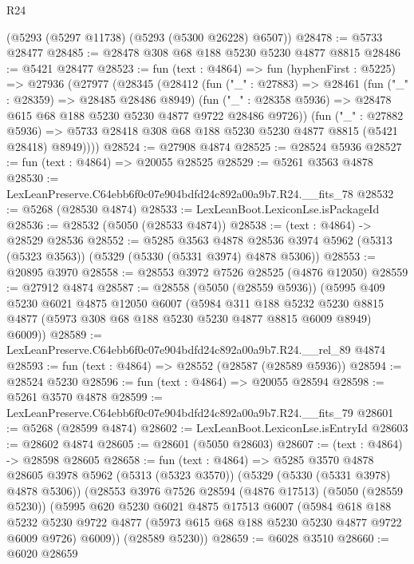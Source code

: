 \begin{lexlean}{R24}
\begin{coremodule}
    (@5293 (@5297 @11738) (@5293 (@5300 @26228) @6507))
@28478 := @5733 @28477
@28485 := @28478 @308 @68 @188 @5230 @5230 @4877 @8815
@28486 := @5421 @28477
@28523 := fun (text : @4864) =>
  fun (hyphenFirst : @5225) =>
  @27936
    (@27977
      (@28345
        (@28412
          (fun ("_" : @27883) =>
          @28461
            (fun ("_" : @28359) => @28485 @28486 @8949)
            (fun ("_" : @28358 @5936) => @28478 @615 @68 @188 @5230 @5230 @4877 @9722 @28486 @9726))
          (fun ("_" : @27882 @5936) =>
          @5733 @28418 @308 @68 @188 @5230 @5230 @4877 @8815 (@5421 @28418) @8949))))
@28524 := @27908 @4874
@28525 := @28524 @5936
@28527 := fun (text : @4864) => @20055 @28525
@28529 := @5261 @3563 @4878
@28530 := LexLeanPreserve.C64ebb6f0c07e904bdfd24c892a00a9b7.R24.__fits_78
@28532 := @5268 (@28530 @4874)
@28533 := LexLeanBoot.LexiconLse.isPackageId
@28536 := @28532 (@5050 (@28533 @4874))
@28538 := (text : @4864) -> @28529 @28536
@28552 := @5285
    @3563
    @4878
    @28536
    @3974
    @5962
    (@5313 (@5323 @3563))
    (@5329 (@5330 (@5331 @3974) @4878 @5306))
@28553 := @20895 @3970
@28558 := @28553 @3972 @7526 @28525 (@4876 @12050)
@28559 := @27912 @4874
@28587 := @28558
    (@5050 (@28559 @5936))
    (@5995
      @409
      @5230
      @6021
      @4875
      @12050
      @6007
      (@5984
        @311
        @188
        @5232
        @5230
        @8815
        @4877
        (@5973 @308 @68 @188 @5230 @5230 @4877 @8815 @6009 @8949)
        @6009))
@28589 := LexLeanPreserve.C64ebb6f0c07e904bdfd24c892a00a9b7.R24.__rel_89 @4874
@28593 := fun (text : @4864) => @28552 (@28587 (@28589 @5936))
@28594 := @28524 @5230
@28596 := fun (text : @4864) => @20055 @28594
@28598 := @5261 @3570 @4878
@28599 := LexLeanPreserve.C64ebb6f0c07e904bdfd24c892a00a9b7.R24.__fits_79
@28601 := @5268 (@28599 @4874)
@28602 := LexLeanBoot.LexiconLse.isEntryId
@28603 := @28602 @4874
@28605 := @28601 (@5050 @28603)
@28607 := (text : @4864) -> @28598 @28605
@28658 := fun (text : @4864) =>
  @5285
    @3570
    @4878
    @28605
    @3978
    @5962
    (@5313 (@5323 @3570))
    (@5329 (@5330 (@5331 @3978) @4878 @5306))
    (@28553
      @3976
      @7526
      @28594
      (@4876 @17513)
      (@5050 (@28559 @5230))
      (@5995
        @620
        @5230
        @6021
        @4875
        @17513
        @6007
        (@5984
          @618
          @188
          @5232
          @5230
          @9722
          @4877
          (@5973 @615 @68 @188 @5230 @5230 @4877 @9722 @6009 @9726)
          @6009))
      (@28589 @5230))
@28659 := @6028 @3510
@28660 := @6020 @28659

\end{coremodule}
\end{lexlean}
